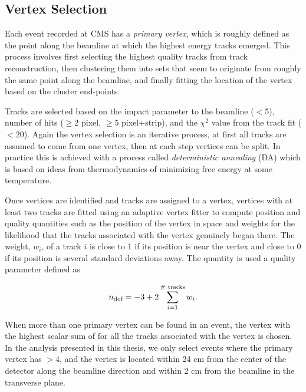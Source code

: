   \subsection{Vertex Selection} \label{sec:vertex_selection}
    Each event recorded at CMS has a \emph{primary vertex}, which is roughly defined as the point along the beamline at which the highest energy tracks emerged. This process involves first selecting the highest quality tracks from track reconstruction, then clustering them into sets that seem to originate from roughly the same point along the beamline, and finally fitting the location of the vertex based on the cluster end-points. 

    Tracks are selected based on the impact parameter to the beamline ($<$5), number of hits ($\ge 2$ pixel, $\ge 5$ pixel+strip), and the $\chi^2$ value from the track fit ($<20$). Again the vertex selection is an iterative process, at first all tracks are assumed to come from one vertex, then at each step vertices can be split. In practice this is achieved with a process called \emph{deterministic annealing} (DA) which is based on ideas from thermodynamics of minimizing free energy at some temperature. 

    Once vertices are identified and tracks are assigned to a vertex, vertices with at least two tracks are fitted using an adaptive vertex fitter \cite{adaptive_vertex_fitter} to compute position and quality quantities such as the position of the vertex in space and weights for the likelihood that the tracks associated with the vertex genuinely began there. The weight, $w_i$, of a track $i$ is close to 1 if its position is near the vertex and close to 0 if its position is several standard deviations away. The quantity \ndof is used a quality parameter defined as

    \[
      n_{\text{dof}} = -3+2 \sum \limits_{i=1}^{\text{\# tracks}} w_i.
    \]

    When more than one primary vertex can be found in an event, the vertex with the highest scalar sum of \pt for all the tracks associated with the vertex is chosen. In the analysis presented in this thesis, we only select events where the primary vertex has \ndof $>4$, and the vertex is located within 24 cm from the center of the detector along the beamline direction and within 2 cm from the beamline in the transverse plane.

